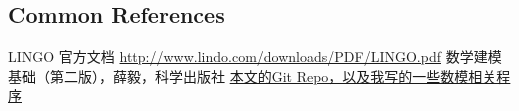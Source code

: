 \documentclass[12pt,a4paper]{article} \usepackage{kurier}
\begin{document}
\begin{CJK}{UTF8}{gkai}
\newpage
\section{Common References}
\begin{thebibliography}{9}
 LINGO 官方文档 \url{http://www.lindo.com/downloads/PDF/LINGO.pdf}
\bibitem{} 数学建模基础（第二版），薛毅，科学出版社
\bibitem{} \href{https://github.com/CDLuminate/mathmod}{本文的Git Repo，以及我写的一些数模相关程序}
\end{thebibliography}

\end{CJK}
\end{document}
